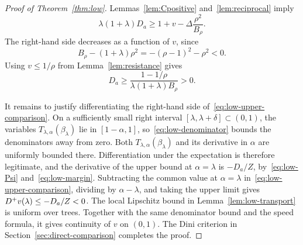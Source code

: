 \begin{proof}[Proof of Theorem~\ref{thm:low}]
Lemmas~\ref{lem:Cpositive} and~\ref{lem:reciprocal} imply
\begin{equation*}
 \lambda(1+\lambda)D_a\ge1+v-\Delta\frac{\rho^2}{B_\rho}.
\end{equation*}
The right-hand side decreases as a function of $v$, since
\begin{equation*}
 B_\rho-(1+\lambda)\rho^2=-(\rho-1)^2-\rho^2<0.
\end{equation*}
Using $v\le1/\rho$ from Lemma~\ref{lem:resistance} gives
\begin{equation}\label{eq:low-strict}
 D_a\ge\frac{1-1/\rho}{\lambda(1+\lambda)B_\rho}>0.
\end{equation}

It remains to justify differentiating the right-hand side of~\eqref{eq:low-upper-comparison}. On a sufficiently small right interval $[\lambda,\lambda+\delta]\subset(0,1)$, the variables $T_{\lambda,\alpha}(\beta_\lambda)$ lie in $[1-\alpha,1]$, so~\eqref{eq:low-denominator} bounds the denominators away from zero. Both $T_{\lambda,\alpha}(\beta_\lambda)$ and its derivative in $\alpha$ are uniformly bounded there. Differentiation under the expectation is therefore legitimate, and the derivative of the upper bound at $\alpha=\lambda$ is $-D_a/Z$, by~\eqref{eq:low-Psi} and~\eqref{eq:low-margin}. Subtracting the common value at $\alpha=\lambda$ in~\eqref{eq:low-upper-comparison}, dividing by $\alpha-\lambda$, and taking the upper limit gives $D^{+} v(\lambda)\le-D_a/Z<0$. The local Lipschitz bound in Lemma~\ref{lem:low-transport} is uniform over trees. Together with the same denominator bound and the speed formula, it gives continuity of $v$ on $(0,1)$. The Dini criterion in Section~\ref{sec:direct-comparison} completes the proof.
\end{proof}
